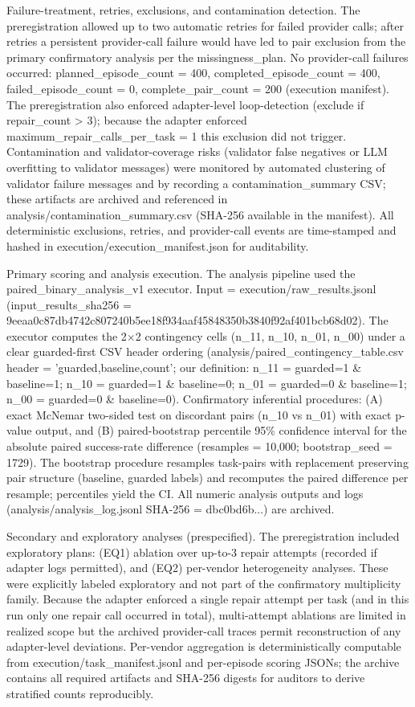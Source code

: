 \documentclass[conference]{IEEEtran}
\begin{document}
Failure-treatment, retries, exclusions, and contamination detection. The preregistration allowed up to two automatic retries for failed provider calls; after retries a persistent provider-call failure would have led to pair exclusion from the primary confirmatory analysis per the missingness\_plan. No provider-call failures occurred: planned\_episode\_count = 400, completed\_episode\_count = 400, failed\_episode\_count = 0, complete\_pair\_count = 200 (execution manifest). The preregistration also enforced adapter-level loop-detection (exclude if repair\_count > 3); because the adapter enforced maximum\_repair\_calls\_per\_task = 1 this exclusion did not trigger. Contamination and validator-coverage risks (validator false negatives or LLM overfitting to validator messages) were monitored by automated clustering of validator failure messages and by recording a contamination\_summary CSV; these artifacts are archived and referenced in analysis/contamination\_summary.csv (SHA-256 available in the manifest). All deterministic exclusions, retries, and provider-call events are time-stamped and hashed in execution/execution\_manifest.json for auditability.

Primary scoring and analysis execution. The analysis pipeline used the paired\_binary\_analysis\_v1 executor. Input = execution/raw\_results.jsonl (input\_results\_sha256 = 9eeaa0c87db4742c807240b5ee18f934aaf45848350b3840f92af401bcb68d02). The executor computes the 2\ensuremath{\times}2 contingency cells (n\_11, n\_10, n\_01, n\_00) under a clear guarded-first CSV header ordering (analysis/paired\_contingency\_table.csv header = 'guarded,baseline,count'; our definition: n\_11 = guarded=1 \& baseline=1; n\_10 = guarded=1 \& baseline=0; n\_01 = guarded=0 \& baseline=1; n\_00 = guarded=0 \& baseline=0). Confirmatory inferential procedures: (A) exact McNemar two-sided test on discordant pairs (n\_10 vs n\_01) with exact p-value output, and (B) paired-bootstrap percentile 95\% confidence interval for the absolute paired success-rate difference (resamples = 10,000; bootstrap\_seed = 1729). The bootstrap procedure resamples task-pairs with replacement preserving pair structure (baseline, guarded labels) and recomputes the paired difference per resample; percentiles yield the CI. All numeric analysis outputs and logs (analysis/analysis\_log.jsonl SHA-256 = dbc0bd6b...) are archived.

Secondary and exploratory analyses (prespecified). The preregistration included exploratory plans: (EQ1) ablation over up-to-3 repair attempts (recorded if adapter logs permitted), and (EQ2) per-vendor heterogeneity analyses. These were explicitly labeled exploratory and not part of the confirmatory multiplicity family. Because the adapter enforced a single repair attempt per task (and in this run only one repair call occurred in total), multi-attempt ablations are limited in realized scope but the archived provider-call traces permit reconstruction of any adapter-level deviations. Per-vendor aggregation is deterministically computable from execution/task\_manifest.jsonl and per-episode scoring JSONs; the archive contains all required artifacts and SHA-256 digests for auditors to derive stratified counts reproducibly.
\end{document}
